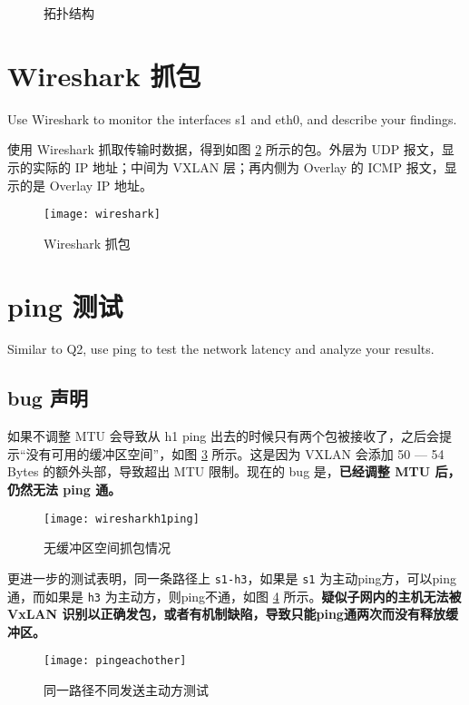     \begin{figure}[H]
        \centering
        
        \caption{拓扑结构}\label{fig:toposym}
    \end{figure}

    \section{Wireshark 抓包}\label{sec:wireshark}
    Use Wireshark to monitor the interfaces s1 and eth0, and describe your findings.

    使用 Wireshark 抓取传输时数据，得到如图 \ref{fig:wireshark} 所示的包。外层为 UDP 报文，显示的实际的 IP 地址；中间为 VXLAN 层；再内侧为 Overlay 的 ICMP 报文，显示的是 Overlay IP 地址。

    \begin{figure}[H]
        \centering
        \texttt{[image: wireshark]}
        \caption{Wireshark 抓包}\label{fig:wireshark}
    \end{figure}

    \section{ping 测试}
    Similar to Q2, use ping to test the network latency and analyze your results.

    \subsection{bug 声明}

    如果不调整 MTU 会导致从 h1 ping 出去的时候只有两个包被接收了，之后会提示“没有可用的缓冲区空间”，如图 \ref{fig:wiresharkh1ping} 所示。这是因为 VXLAN 会添加 50 --- 54 Bytes 的额外头部，导致超出 MTU 限制。现在的 bug 是，\textbf{已经调整 MTU 后，仍然无法 ping 通。}

    \begin{figure}[H]
        \centering
        \texttt{[image: wiresharkh1ping]}
        \caption{无缓冲区空间抓包情况}\label{fig:wiresharkh1ping}
    \end{figure}

    更进一步的测试表明，同一条路径上 \verb"s1-h3"，如果是 \verb"s1" 为主动ping方，可以ping通，而如果是 \verb"h3" 为主动方，则ping不通，如图 \ref{fig:pingeachother} 所示。\textbf{疑似子网内的主机无法被 VxLAN 识别以正确发包，或者有机制缺陷，导致只能ping通两次而没有释放缓冲区。}
    
    \begin{figure}[H]
        \centering
        \texttt{[image: pingeachother]}
        \caption{同一路径不同发送主动方测试}\label{fig:pingeachother}
    \end{figure}


